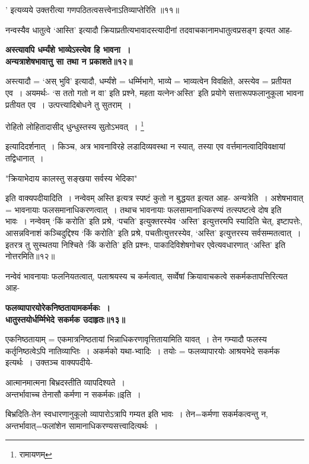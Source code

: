 {{' इत्यव्यये उक्तरीत्या गणपठितत्वसत्त्वेनाऽतिव्याप्तेरिति ॥११॥\par
 नन्वस्यैव धातुत्वे `आस्ति' इत्यादौ क्रियाप्रतीत्यभावादस्त्यादीनां तदवाचकानामधातुत्वप्रसङ्ग इत्यत आह-
\begin{center}{\bfseries अस्त्यावपि धर्म्यंशे भाव्येऽस्त्येव हि भावना~।\\
 अन्यत्राशेषभावात्तु सा तथा न प्रकाशते॥१२॥}
\end{center} 
 अस्त्यादौ = `अस् भुवि' इत्यादौ, धर्म्यंशे = धर्म्मिभागे, भाव्ये = भाव्यत्वेन विवक्षिते, अस्त्येव = प्रतीयत एव~।
अयमर्थः- `स ततो गतो न वा' इति प्रश्ने, महता यत्नेन`अस्ति' इति प्रयोगे सत्तारूपफलानुकूला भावना प्रतीयत एव~।
 उत्पत्त्यादिबोधने तु सुतराम्~।
 \begin{center}रोहितो लोहितादासीद् धुन्धुस्तस्य सुतोऽभवत्~।
\footnote{रामायणम् }
\end{center}इत्यादिदर्शनात्~।
 किञ्च, अत्र भावनाविरहे लडादिव्यवस्था न स्यात्, तस्या एव वर्त्तमानत्वादिविवक्षायां तद्विधानात्~।
\begin{center} "क्रियाभेदाय कालस्तु सङ्खया सर्वस्य भेदिका"\end{center}
इति वाक्यपदीयादिति~।
 नन्वेवम् अस्ति इत्यत्र स्पष्टं कुतो न बुद्धयत इत्यत आह- अन्यत्रेति~।
 अशेषभावात् = भावनायाः फलसमानाधिकरणत्वात्~।
तथाच भावनायाः फलसामानाधिकरण्यं तत्स्पष्टत्वे दोष इति भावः~।
 नन्वेवम् `किं करोति' इति प्रश्रे, `पचति' इत्युक्तरस्येव `अस्ति' इत्युत्तरमपि स्यादिति चेत्, इष्टापत्तेः, आसन्नविनाशं कञ्चिदुद्दिश्य `किं करोति' इति प्रश्रे, पचतीत्युत्तरस्येव, `अस्ति' इत्युत्तरस्य सर्वसम्मतत्वात्~।
इतरत्र तु सुस्थतया निश्चिते `किं करोति' इति प्रश्नः, पाकादिविशेषगोचर एवेत्यवधारणात् `अस्ति' इति नोत्तरमिति॥१२॥\par
 नन्वेवं भावनायाः फलनियतत्वात्, पलाश्रयस्य च कर्मत्वात्, सर्व्वेषां क्रियावाचकत्वे सकर्मकतापत्तिरित्यत आह-
\begin{center}{\bfseries फलव्यापारयोरेकनिष्ठतायामकर्मकः~।\\
 धातुस्तयोर्धर्म्मिभेदे सकर्मक उदाहृतः॥१३॥}
\end{center}
एकनिष्ठतायाम् = एकमात्रनिष्ठतायां भिन्नाधिकरणावृत्तितायामिति यावत्~।
तेन गम्यादौ फलस्य कर्तृनिष्ठत्वेऽपि नातिव्याप्तिः~।
अकर्मको यथा-भ्वादिः~।
तयोः = फलव्यापारयोः आश्रयभेदे सकर्मक इत्यर्थः~।
उक्तञ्च वाक्यपदीये-
\begin{center} आत्मानमात्मना बिभ्रदस्तीति व्यापदिश्यते~।\\
 अन्तर्भावाच्च तेनासौ कर्मणा न सकर्मकः॥इति~।
\end{center}
 बिभ्रदिति-तेन स्वधारणानुकूलो व्यापारोऽत्रापि गम्यत इति भावः~।
तेन=कर्मणा सकर्मकत्वन्तु न, अन्तर्भावात्=फलांशेन सामानाधिकरण्यसत्त्वादित्यर्थः~।
}}
